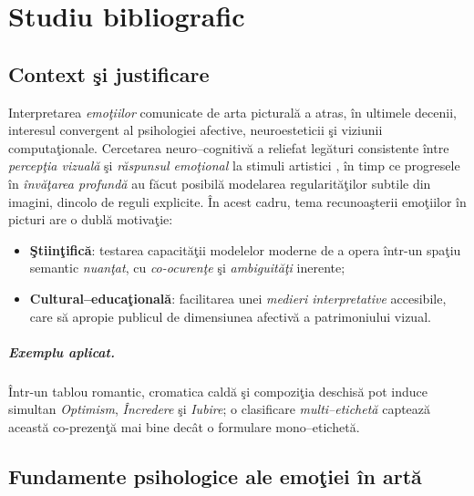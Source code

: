 \chapter{Studiu bibliografic}
\label{ch:studiubib}


\section{Context şi justificare}

Interpretarea \emph{emoţiilor} comunicate de arta picturală a atras, în ultimele decenii, interesul convergent al psihologiei afective, neuroesteticii şi viziunii computaţionale. Cercetarea neuro–cognitivă a reliefat legături consistente între \emph{percepţia vizuală} şi \emph{răspunsul emoţional} la stimuli artistici \cite{zeki2001neural}, în timp ce progresele în \emph{învăţarea profundă} au făcut posibilă modelarea regularităţilor subtile din imagini, dincolo de reguli explicite. În acest cadru, tema recunoaşterii emoţiilor în picturi are o dublă motivaţie:
\begin{itemize}[leftmargin=*, itemsep=2pt, topsep=2pt]
  \item \textbf{Ştiinţifică}: testarea capacităţii modelelor moderne de a opera într-un spaţiu semantic \emph{nuanţat}, cu \emph{co-ocurenţe} şi \emph{ambiguităţi} inerente;
  \item \textbf{Cultural–educaţională}: facilitarea unei \emph{medieri interpretative} accesibile, care să apropie publicul de dimensiunea afectivă a patrimoniului vizual.
\end{itemize}

\paragraph{Exemplu aplicat.} Într-un tablou romantic, cromatica caldă şi compoziţia deschisă pot induce simultan \emph{Optimism}, \emph{Încredere} şi \emph{Iubire}; o clasificare \emph{multi–etichetă} captează această co-prezenţă mai bine decât o formulare mono–etichetă.

\section{Fundamente psihologice ale emoţiei în artă}

